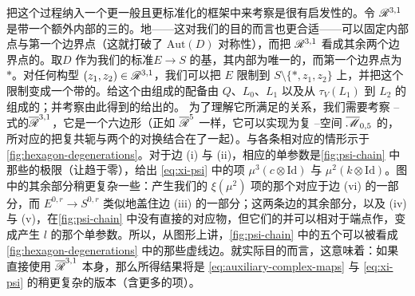 \begin{remark}\label{thm:standardized-framework}
把这个过程纳入一个更一般且更标准化的框架中来考察是很有启发性的。令 $\mathscr{R}^{3,1}$ 是带一个额外内部\trMarkedPoint{}的三\trPointedDisc{}的\trModuliSpace。\trEquivalence{}地——这对我们的目的而言也更合适——可以固定内部点与第一个边界点（这就打破了 $\mathrm{Aut}(D)$ 对称性），而把 $\mathscr{R}^{3,1}$ 看成其余两个边界点的\trConfigurationSpace。取\trDisk{}$D$ 作为我们的标准\trLefschetzFibration{}$E\to S$ 的基，其内部\trMarkedPoint{}为唯一的\trCriticalValue，而第一个边界点为 $\ast$。对任何构型 $(z_1,z_2)\in\mathscr{R}^{3,1}$，我们可以把 $E$ 限制到 $S\setminus\{\ast,z_1,z_2\}$ 上，并把这个限制变成一个带\trStriplikeEnd{}的\trLefschetzFibration。给这个由\trFibration{}组成的\trFamily{}配备由 $Q$、$L_0$、$L_1$ 以及从 $\tau_V(L_1)$ 到 $L_2$ 的\trIsotopy{}组成的\trLagrange\trBoundaryCondition；并考察由此得到的\trParametrization{}\trModuliSpace{}给出的\trInvariant。
为了理解它所满足的关系，我们需要考察 \trDeligne--\trMumford{}式的\trCompactification{}$\overline{\mathscr{R}}^{3,1}$，它是一个六边形（正如 $\overline{\mathscr{R}}^5$ 一样，它可以实现为复 \trDeligne--\trMumford{}空间 $\overline{\mathscr{M}}_{0,5}$ 的\trRealLocus，所对应的\trAntiholomorphic\trInvolution{}把复共轭与两个\trMarkedPoint{}的对换结合在了一起）。与各条\trStratum{}相对应的\trDegenerate{}情形示于\cref{fig:hexagon-degenerations}。对于边 (i) 与 (ii)，相应的单参数\trFamily{}是\cref{fig:psi-chain} 中那些\trFamily{}的极限（让\trGluingParameter{}趋于零），给出 \eqref{eq:xi-psi} 中的项 $\mu^3(c\otimes\mathrm{Id})$ 与 $\mu^2(k\otimes\mathrm{Id})$。图中的其余部分稍更复杂一些：产生我们的 $\xi(\mu^2)$ 项的那个\trFamily{}对应于边 (vi) 的一部分，而 $E^{0,r}\to S^{0,r}$ 类似地盖住边 (iii) 的一部分；这两条边的其余部分，以及 (iv) 与 (v)，在\cref{fig:psi-chain} 中没有直接的对应物，但它们的并可以相对于端点作\trDeformation，变成产生 $l$ 的那个单参数\trFamily。所以，从图形上讲，\cref{fig:psi-chain} 中的五个\trFamily{}可以被看成 \cref{fig:hexagon-degenerations} 中的那些虚线边。就实际目的而言，这意味着：如果直接使用 $\overline{\mathscr{R}}^{3,1}$ 本身，那么所得结果将是 \eqref{eq:auxiliary-complex-maps} 与 \eqref{eq:xi-psi} 的稍更复杂的版本（含更多的项）。
\end{remark}
